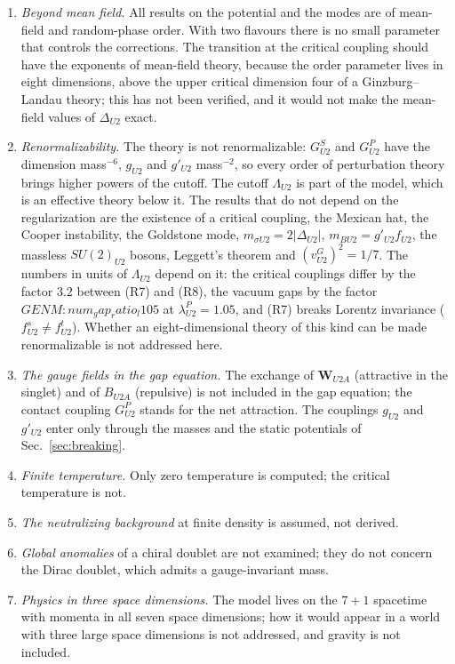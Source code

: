 \begin{enumerate}
\item \emph{Beyond mean field.} All results on the potential and the modes are of mean-field and
random-phase order. With two flavours there is no small parameter that controls the corrections. The
transition at the critical coupling should have the exponents of mean-field theory, because the
order parameter lives in eight dimensions, above the upper critical dimension four of a
Ginzburg--Landau theory; this has not been verified, and it would not make the mean-field values of
$\Delta_{U2}$ exact.
\item \emph{Renormalizability.} The theory is not renormalizable: $G^S_{U2}$ and $G^P_{U2}$ have the
dimension mass$^{-6}$, $g_{U2}$ and $g'_{U2}$ mass$^{-2}$, so every order of perturbation theory
brings higher powers of the cutoff. The cutoff $\Lambda_{U2}$ is part of the model, which is an
effective theory below it. The results that do not depend on the regularization are the existence of
a critical coupling, the Mexican hat, the Cooper instability, the Goldstone mode, $m_{\sigma U2}=2|\Delta_{U2}|$,
$m_{BU2}=g'_{U2}f_{U2}$, the massless $SU(2)_{U2}$ bosons, Leggett's theorem and $(v^G_{U2})^2=1/7$. The
numbers in units of $\Lambda_{U2}$ depend on it: the critical couplings differ by the factor $3.2$ between
(R7) and (R8), the vacuum gaps by the factor ${{GENM:num_gap_ratio_l105}}$ at $\lambda^P_{U2}=1.05$, and (R7) breaks Lorentz invariance
($f^s_{U2}\neq f^t_{U2}$). Whether an eight-dimensional theory of this kind can be made renormalizable
is not addressed here.
\item \emph{The gauge fields in the gap equation.} The exchange of $\boldsymbol W_{U2A}$ (attractive in
the singlet) and of $B_{U2A}$ (repulsive) is not included in the gap equation; the contact coupling
$G^P_{U2}$ stands for the net attraction. The couplings $g_{U2}$ and $g'_{U2}$ enter only through the
masses and the static potentials of Sec.~\ref{sec:breaking}.
\item \emph{Finite temperature.} Only zero temperature is computed; the critical temperature is not.
\item \emph{The neutralizing background} at finite density is assumed, not derived.
\item \emph{Global anomalies} of a chiral doublet are not examined; they do not concern the Dirac
doublet, which admits a gauge-invariant mass.
\item \emph{Physics in three space dimensions.} The model lives on the $7+1$ spacetime with momenta in
all seven space dimensions; how it would appear in a world with three large space dimensions is
not addressed, and gravity is not included.
\end{enumerate}

